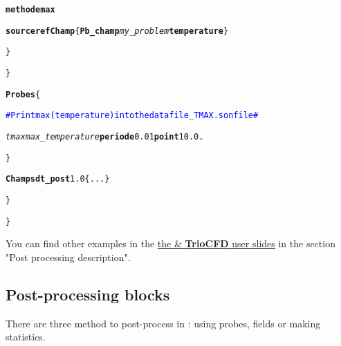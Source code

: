 \begin{itemize}
\begin{center}
{\begin{minipage}[c]{0.9\textwidth}
\begin{alltt}
\hspace{2cm}            {\bf{methode max}}

\hspace{2cm}            {\bf{source refChamp}} \{ {\bf{Pb\_champ}} \textit{my\_problem} {\bf{temperature}} \}

\hspace{1.5cm}            \}

\hspace{1cm}        \}

\hspace{1cm}        {\bf{Probes}} \{

\hspace{1.5cm}            \textcolor{blue}{\# Print max(temperature) into the datafile\_TMAX.son file \#}

\hspace{1.5cm}            \textit{tmax} \textit{max\_temperature} {\bf{periode}} 0.01 {\bf{point}} 1 0. 0.

\hspace{1cm}        \}

\hspace{1cm}        {\bf{Champs dt\_post}} 1.0 \{ ... \}

\hspace{0.5cm}        \}

\}
\end{alltt}
\end{minipage}}
\end{center}

You can find other examples in the \href{TRUST_and_TrioCFD_presentation.pdf}{the \trust \& \textbf{TrioCFD} user slides} in the section "Post processing description".
\end{itemize}





\subsection{Post-processing blocks}
There are three method to post-process in \trust: using probes, fields or making statistics.


